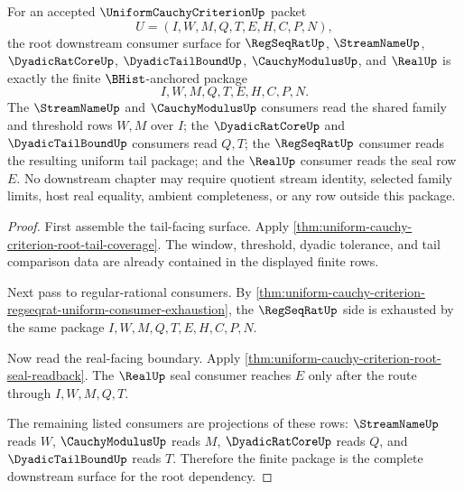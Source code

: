 \begin{theorem}
\label{thm:uniform-cauchy-criterion-root-downstream-unblock}
For an accepted $\UniformCauchyCriterionUp$ packet
$$
U=(I,W,M,Q,T,E,H,C,P,N),
$$
the root downstream consumer surface for $\RegSeqRatUp$, $\StreamNameUp$, $\DyadicRatCoreUp$, $\DyadicTailBoundUp$, $\CauchyModulusUp$, and $\RealUp$ is exactly the finite $\BHist$-anchored package
$$
I,W,M,Q,T,E,H,C,P,N.
$$
The $\StreamNameUp$ and $\CauchyModulusUp$ consumers read the shared family and threshold rows $W,M$ over $I$; the $\DyadicRatCoreUp$ and $\DyadicTailBoundUp$ consumers read $Q,T$; the $\RegSeqRatUp$ consumer reads the resulting uniform tail package; and the $\RealUp$ consumer reads the seal row $E$. No downstream chapter may require quotient stream identity, selected family limits, host real equality, ambient completeness, or any row outside this package.
\end{theorem}
\begin{proof}
First assemble the tail-facing surface. Apply \autoref{thm:uniform-cauchy-criterion-root-tail-coverage}. The window, threshold, dyadic tolerance, and tail comparison data are already contained in the displayed finite rows.

Next pass to regular-rational consumers. By \autoref{thm:uniform-cauchy-criterion-regseqrat-uniform-consumer-exhaustion}, the $\RegSeqRatUp$ side is exhausted by the same package $I,W,M,Q,T,E,H,C,P,N$.

Now read the real-facing boundary. Apply \autoref{thm:uniform-cauchy-criterion-root-seal-readback}. The $\RealUp$ seal consumer reaches $E$ only after the route through $I,W,M,Q,T$.

The remaining listed consumers are projections of these rows: $\StreamNameUp$ reads $W$, $\CauchyModulusUp$ reads $M$, $\DyadicRatCoreUp$ reads $Q$, and $\DyadicTailBoundUp$ reads $T$. Therefore the finite package is the complete downstream surface for the root dependency.
\end{proof}

